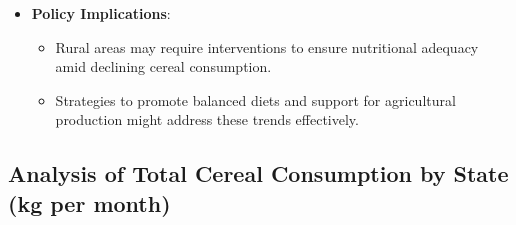 \documentclass{article}
\begin{document}
\begin{itemize}
\begin{itemize}
		\item Dietary Diversification: Increased consumption of other food groups like proteins and processed foods.
		\item Economic Growth: Enhanced income levels leading to diverse eating habits in urban areas.
		\item Lifestyle Changes: Rising preference for ready-to-eat foods, especially in urban households.
	\end{itemize}
	\item \textbf{Policy Implications}:
	\begin{itemize}
		\item Rural areas may require interventions to ensure nutritional adequacy amid declining cereal consumption.
		\item Strategies to promote balanced diets and support for agricultural production might address these trends effectively.
	\end{itemize}
\end{itemize}








\subsection{Analysis of Total Cereal Consumption by State (kg per month)}
\end{document}
